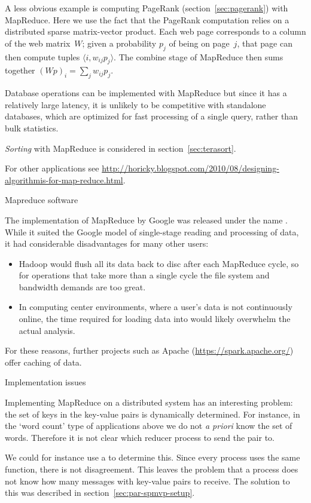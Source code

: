 A less obvious example is computing PageRank
(section~\ref{sec:pagerank}) with MapReduce. Here we use the fact that
the PageRank computation relies on a distributed sparse matrix-vector
product. Each web page corresponds to a column of the web matrix~$W$;
given a probability $p_j$ of being on page~$j$, that page can then
compute tuples $\langle i,w_{ij}p_j\rangle$. The combine stage of MapReduce
then sums together $(Wp)_i=\sum_j w_{ij}p_j$.

Database operations can be implemented with MapReduce but since it has
a relatively large latency, it is unlikely to be competitive with
standalone databases, which are optimized for fast processing of a
single query, rather than bulk statistics.

\emph{Sorting}
  with MapReduce is considered in section~\ref{sec:terasort}.

For other applications see
\url{http://horicky.blogspot.com/2010/08/designing-algorithmis-for-map-reduce.html}.

 {Mapreduce software}

The implementation of MapReduce by Google was released under the name .
While it suited the Google model of single-stage reading and processing of data,
it had considerable disadvantages for many other users:
\begin{itemize}
\item Hadoop would flush all its data back to disc after each MapReduce cycle, so
  for operations that take more than a single cycle the file system
  and bandwidth demands are too great.
\item In computing center environments, where a user's data is not continuously online,
  the time required for loading data into  would likely overwhelm the
  actual analysis.
\end{itemize}
For these reasons, further projects such as Apache 
(\url{https://spark.apache.org/}) offer caching of data.

 {Implementation issues}

Implementing MapReduce on a distributed system has an interesting
problem: the set of keys in the key-value pairs is dynamically
determined. For instance, in the `word count' type of applications
above we do not \textsl{a priori} know the set of words. Therefore it
is not clear which reducer process to send the pair to.

We could for instance use a  to determine
this. Since every process uses the same function, there is not
disagreement. This leaves the problem that a process does not know how
many messages with key-value pairs to receive. The solution to this
was described in section~\ref{sec:par-spmvp-setup}.

